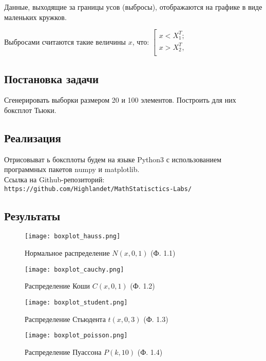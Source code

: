 \documentclass[14pt]{extarticle}
\begin{document}
Данные, выходящие за границы усов (выбросы), отображаются на графике в виде маленьких кружков.

Выбросами считаются такие величины \(x\), что:
$\left[
      \begin{gathered}
        x < X_1^T; \\
        x > X_2^T, \\
      \end{gathered}
\right.$

\subsection{Постановка задачи}

Сгенерировать выборки размером 20 и 100 элементов. Построить для них боксплот Тьюки.

\subsection{Реализация}

Отрисовыват ь боксплоты будем на языке Python3 с использованием программных пакетов numpy и matplotlib.\\
Ссылка на Github-репозиторий:\\
\texttt{https://github.com/Highlandet/MathStatisctics-Labs/}

\subsection{Результаты}

\begin{figure}[H]
    \centering
    \texttt{[image: boxplot\_hauss.png]}
    \caption{Нормальное распределение \(N(x, 0, 1)\) (Ф. 1.1)}
    \label{fig:enter-label}
\end{figure}

\begin{figure}[H]
    \centering
    \texttt{[image: boxplot\_cauchy.png]}
    \caption{Распределение Коши \(C(x, 0, 1)\) (Ф. 1.2)}
    \label{fig:enter-label}
\end{figure}

\begin{figure}[H]
    \centering
    \texttt{[image: boxplot\_student.png]}
    \caption{Распределение Стьюдента \(t(x, 0, 3)\) (Ф. 1.3)}
    \label{fig:enter-label}
\end{figure}

\begin{figure}[H]
    \centering
    \texttt{[image: boxplot\_poisson.png]}
    \caption{Распределение Пуассона \(P(k, 10)\) (Ф. 1.4)}
    \label{fig:enter-label}
\end{figure}
\end{document}
